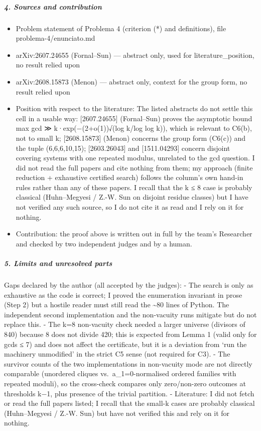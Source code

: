 \documentclass[11pt,a4paper]{article}
\providecommand{\tightlist}{\setlength{\itemsep}{0pt}\setlength{\parskip}{0pt}}
\begin{document}
\subparagraph{4. Sources and
contribution}\label{sources-and-contribution}

\begin{itemize}
\tightlist
\item
  Problem statement of Problema 4 (criterion (*) and definitions), file
  problema-4/enunciato.md
\item
  arXiv:2607.24655 (Fornal--Sun) --- abstract only, used for
  literature\_position, no result relied upon
\item
  arXiv:2608.15873 (Menon) --- abstract only, context for the group
  form, no result relied upon
\item
  Position with respect to the literature: The listed abstracts do not
  settle this cell in a usable way: {[}2607.24655{]} (Fornal--Sun)
  proves the asymptotic bound max gcd ≫ k·exp(−(2+o(1))√(log k/log log
  k)), which is relevant to C6(b), not to small k; {[}2608.15873{]}
  (Menon) concerns the group form (C6(c)) and the tuple (6,6,6,10,15);
  {[}2603.26043{]} and {[}1511.04293{]} concern disjoint covering
  systems with one repeated modulus, unrelated to the gcd question. I
  did not read the full papers and cite nothing from them; my approach
  (finite reduction + exhaustive certified search) follows the column's
  own hand-in rules rather than any of these papers. I recall that the k
  ≤ 8 case is probably classical (Huhn--Megyesi / Z.-W. Sun on disjoint
  residue classes) but I have not verified any such source, so I do not
  cite it as read and I rely on it for nothing.
\item
  Contribution: the proof above is written out in full by the team's
  Researcher and checked by two independent judges and by a human.
\end{itemize}

\subparagraph{5. Limits and unresolved
parts}\label{limits-and-unresolved-parts}

Gaps declared by the author (all accepted by the judges): - The search
is only as exhaustive as the code is correct; I proved the enumeration
invariant in prose (Step 2) but a hostile reader must still read the
\textasciitilde80 lines of Python. The independent second implementation
and the non-vacuity runs mitigate but do not replace this. - The k=8
non-vacuity check needed a larger universe (divisors of 840) because 8
does not divide 420; this is expected from Lemma 1 (valid only for gcds
≤ 7) and does not affect the certificate, but it is a deviation from
`run the machinery unmodified' in the strict C5 sense (not required for
C3). - The survivor counts of the two implementations in non-vacuity
mode are not directly comparable (unordered cliques
vs.~a\_1=0-normalised ordered families with repeated moduli), so the
cross-check compares only zero/non-zero outcomes at thresholds k−1, plus
presence of the trivial partition. - Literature: I did not fetch or read
the full papers listed; I recall that the small-k cases are probably
classical (Huhn--Megyesi / Z.-W. Sun) but have not verified this and
rely on it for nothing.
\end{document}
